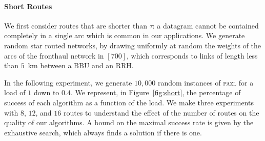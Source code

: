 \documentclass[a4paper,10pt]{journal}
\newcommand\pazl{\textsc{pazl}\xspace}
\begin{document}
    \paragraph{Short Routes}
      
    



We first consider routes that are shorter than $\tau$: a datagram cannot be contained completely in a single arc which is common in our applications. We generate random star routed networks, by drawing uniformly at random the weights of the arcs of the fronthaul network in $[700]$, which corresponds to links of length less than $5$~km between a BBU and an RRH.

In the following experiment, we generate $10,000$ random instances of \pazl for a load of $1$ down to $0.4$. We represent, in Figure~\ref{fig:short}, the percentage of success of each algorithm as a function of the load. We make three experiments with $8$, $12$, and $16$ routes to understand the effect of the number of routes on the quality of our algorithms. A bound on the maximal success rate is given by the exhaustive search, which always finds a solution if there is one.
\end{document}
